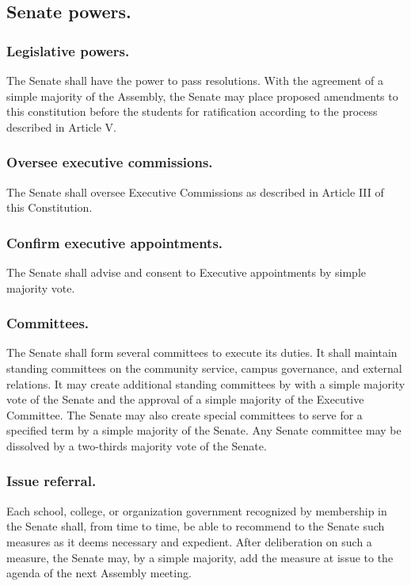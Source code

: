 \subsection{Senate powers.}

\subsubsection{Legislative powers.}
    The Senate shall have the power to pass resolutions. With the agreement of a simple majority of the Assembly, the Senate may place proposed amendments to this constitution before the students for ratification according to the process described in Article V.

\subsubsection{Oversee executive commissions.}
    The Senate shall oversee Executive Commissions as described in Article III of this Constitution.

\subsubsection{Confirm executive appointments.}
    The Senate shall advise and consent to Executive appointments by simple majority vote.

\subsubsection{Committees.}
    The Senate shall form several committees to execute its duties. It shall maintain standing committees on the community service, campus governance, and external relations. It may create additional standing committees by with a simple majority vote of the Senate and the approval of a simple majority of the Executive Committee. The Senate may also create special committees to serve for a specified term by a simple majority of the Senate. Any Senate committee may be dissolved by a two-thirds majority vote of the Senate.

\subsubsection{Issue referral.}
    Each school, college, or organization government recognized by membership in the Senate shall, from time to time, be able to recommend to the Senate such measures as it deems necessary and expedient. After deliberation on such a measure, the Senate may, by a simple majority, add the measure at issue to the agenda of the next Assembly meeting.

